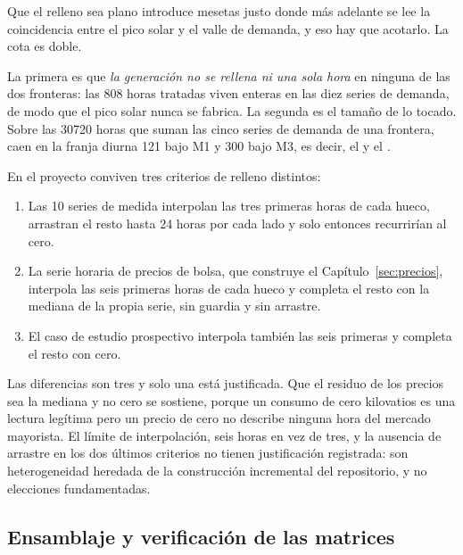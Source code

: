 \begin{guardado}
Que el relleno sea plano introduce mesetas justo donde más adelante se
lee la coincidencia entre el pico solar y el valle de demanda, y eso hay
que acotarlo. La cota es doble.

La primera es que \emph{la generación no se rellena ni una sola hora} en
ninguna de las dos fronteras: las \num{808} horas tratadas viven enteras
en las diez series de demanda, de modo que el pico solar nunca se fabrica.
La segunda es el tamaño de lo tocado. Sobre las \num{30720} horas que
suman las cinco series de demanda de una frontera, caen en la franja
diurna \num{121} bajo M1 y \num{300} bajo M3, es decir, el  y el
.

\begin{trampabox}
En el proyecto conviven tres criterios de relleno distintos:

\begin{enumerate}[leftmargin=*, itemsep=0.2em, topsep=0.3em]
 \item Las 10 series de medida interpolan las tres primeras horas de cada
 hueco, arrastran el resto hasta 24 horas por cada lado y solo entonces
 recurrirían al cero.
 \item La serie horaria de precios de bolsa, que construye el
 Capítulo~\ref{sec:precios}, interpola las seis primeras horas de cada
 hueco y completa el resto con la mediana de la propia serie, sin
 guardia y sin arrastre.
 \item El caso de estudio prospectivo interpola también las seis primeras
 y completa el resto con cero.
\end{enumerate}

Las diferencias son tres y solo una está justificada. Que el residuo de
los precios sea la mediana y no cero se sostiene, porque un consumo de
cero kilovatios es una lectura legítima pero un precio de cero no describe
ninguna hora del mercado mayorista. El límite de interpolación, seis horas
en vez de tres, y la ausencia de arrastre en los dos últimos criterios no
tienen justificación registrada: son heterogeneidad heredada de la
construcción incremental del repositorio, y no elecciones fundamentadas.
\end{trampabox}
\end{guardado}
\subsection{Ensamblaje y verificación de las matrices}
\label{sub:prep-matrices}

